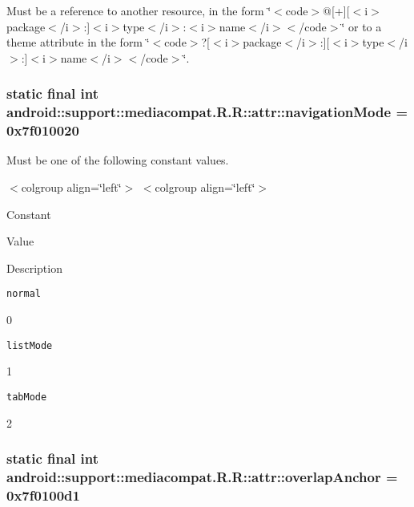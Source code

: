 Must be a reference to another resource, in the form \char`\"{}$<$code$>$@\mbox{[}+\mbox{]}\mbox{[}$<$i$>$package$<$/i$>$:\mbox{]}$<$i$>$type$<$/i$>$:$<$i$>$name$<$/i$>$$<$/code$>$\char`\"{} or to a theme attribute in the form \char`\"{}$<$code$>$?\mbox{[}$<$i$>$package$<$/i$>$:\mbox{]}\mbox{[}$<$i$>$type$<$/i$>$:\mbox{]}$<$i$>$name$<$/i$>$$<$/code$>$\char`\"{}. \hypertarget{classandroid_1_1support_1_1mediacompat_1_1_r_1_1attr_11b4f9a91a73463a812547590b274695}{
\subsubsection[{navigationMode}]{\setlength{\rightskip}{0pt plus 5cm}static final int android::support::mediacompat.R.R::attr::navigationMode = 0x7f010020}}
\label{classandroid_1_1support_1_1mediacompat_1_1_r_1_1attr_11b4f9a91a73463a812547590b274695}


Must be one of the following constant values. \begin{TabularC}{0}
\hline
\end{TabularC}
$<$colgroup align=\char`\"{}left\char`\"{}$>$ $<$colgroup align=\char`\"{}left\char`\"{}$>$ 

Constant

Value

Description 

{\tt normal}

0

{\tt listMode}

1

{\tt tabMode}

2\hypertarget{classandroid_1_1support_1_1mediacompat_1_1_r_1_1attr_53ac0e21565c3c92840c73f4f667ccc7}{
\subsubsection[{overlapAnchor}]{\setlength{\rightskip}{0pt plus 5cm}static final int android::support::mediacompat.R.R::attr::overlapAnchor = 0x7f0100d1}}
\label{classandroid_1_1support_1_1mediacompat_1_1_r_1_1attr_53ac0e21565c3c92840c73f4f667ccc7}


